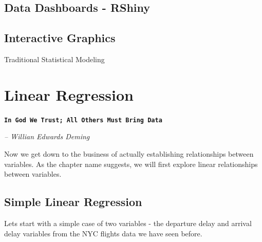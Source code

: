 \documentclass[11pt, letterpaper, twoside]{memoir}\usepackage{knitr}
\makeatletter
\newcommand{\chapterendsymbol}{
    \vspace{24pt}
    \Huge
    \hrulefill \hspace{0.1in} \floweroneleft\floweroneright \hspace{0.1in} \hrulefill
    \normalsize
    }
\renewcommand\part{%
  \if@openright
    \cleardoublepage
  \else
    \clearpage
  \fi
  \thispagestyle{empty}
  \null\vfil
  \secdef\@part\@spart
  }
\makeatother
\begin{document}
\section{Data Dashboards - RShiny}

\section{Interactive Graphics}


\chapterendsymbol


\part{Traditional Statistical Modeling}




\chapter{Linear Regression}

\begin{flushright}

\textbf{\texttt{In God We Trust; All Others Must Bring Data}}

\emph{-- Willian Edwards Deming}

\end{flushright}

\vspace{12pt}


Now we get down to the business of actually establishing relationships between variables. As the chapter name suggests, we will first explore linear relationships between variables. 

\section{Simple Linear Regression}

Lets start with a simple case of two variables - the departure delay and arrival delay variables from the NYC flights data we have seen before.

\begin{knitrout}
\color{fgcolor}\begin{kframe}
\begin{alltt}
 \hlkwb{<-} \hlstd{(}\hlstd{)}
\end{alltt}
\end{kframe}
\end{knitrout}
\end{document}
